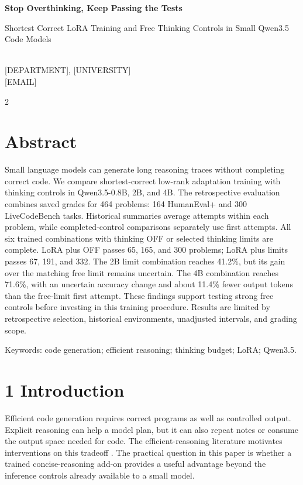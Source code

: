 \documentclass[11pt,letterpaper]{article}
\begin{document}
\begin{center}{\Large\bfseries Stop Overthinking, Keep Passing the Tests}\par\medskip Shortest Correct LoRA Training and Free Thinking Controls in Small Qwen3.5 Code Models\par{}\\{}[DEPARTMENT], [UNIVERSITY]\\{}[EMAIL]\end{center}
\begin{multicols}{2}


\section*{Abstract}

Small language models can generate long reasoning traces without completing correct code. We compare shortest-correct low-rank adaptation training with thinking controls in Qwen3.5-0.8B, 2B, and 4B. The retrospective evaluation combines saved grades for 464 problems: 164 HumanEval+ and 300 LiveCodeBench tasks. Historical summaries average attempts within each problem, while completed-control comparisons separately use first attempts. All six trained combinations with thinking OFF or selected thinking limits are complete. LoRA plus OFF passes 65, 165, and 300 problems; LoRA plus limits passes 67, 191, and 332. The 2B limit combination reaches 41.2\%, but its gain over the matching free limit remains uncertain. The 4B combination reaches 71.6\%, with an uncertain accuracy change and about 11.4\% fewer output tokens than the free-limit first attempt. These findings support testing strong free controls before investing in this training procedure. Results are limited by retrospective selection, historical environments, unadjusted intervals, and grading scope.\par

Keywords: code generation; efficient reasoning; thinking budget; LoRA; Qwen3.5.\par

\section*{1 Introduction}

Efficient code generation requires correct programs as well as controlled output. Explicit reasoning can help a model plan, but it can also repeat notes or consume the output space needed for code. The efficient-reasoning literature motivates interventions on this tradeoff \cite{survey}. The practical question in this paper is whether a trained concise-reasoning add-on provides a useful advantage beyond the inference controls already available to a small model.\par


\end{multicols}
\end{document}
